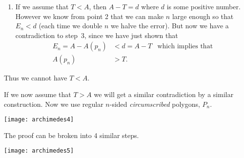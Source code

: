 \begin{enumerate}
\item If we assume that $T<A$, then $A-T = d$ where $d$ is some positive number.
However we know from point 2 that we can make $n$ large enough so that $E_n < d$
(each time we double $n$ we halve the error). But now we have a contradiction to
step~3, since we have just shown that
\begin{align*}
  E_n = A-A(p_n) & < d = A-T & \text{which implies that}\\
  A(p_n) & > T.
\end{align*}
\end{enumerate}
Thus we cannot have $T<A$.

If we now assume that $T>A$ we will get a similar contradiction by a similar
construction. Now we use regular $n$-sided \emph{circumscribed} polygons, $P_n$.
\begin{center}
 \texttt{[image: archimedes4]}
\end{center}
The proof can be broken into 4 similar steps.
\begin{center}
 \texttt{[image: archimedes5]}
\end{center}
